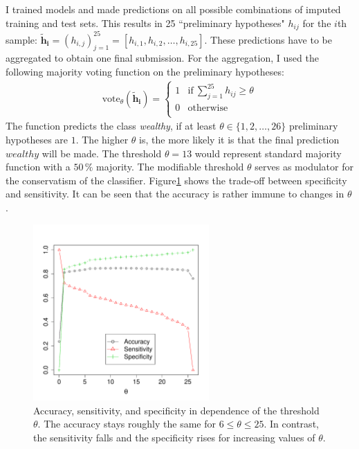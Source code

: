 \documentclass[a4paper]{article}
\begin{document}
I trained models and made predictions on all possible combinations of
imputed training and test sets. This results in 25 ``preliminary
hypotheses" $h_{ij}$ for the $i$th sample:
$\mathbf{\tilde{h}_i} = (h_{i,j})_{j = 1}^{25} = [h_{i,1}, h_{i,2}, \ldots, h_{i,25}]$. These
predictions have to be aggregated to obtain one final submission. For
the aggregation, I used the following majority voting function on the
preliminary hypotheses:
\begin{align}
\text{vote}_\theta(\mathbf{\tilde{h}_i}) =
\begin{cases}
1 & \text{if}~\sum_{j = 1}^{25} h_{ij} \geq \theta\\
0 & \text{otherwise }\\
\end{cases}
\end{align}
The function predicts the class \emph{wealthy}, if at least
$\theta \in \{1, 2, \ldots, 26\}$ preliminary hypotheses are $1$.  The
higher $\theta$ is, the more likely it is that the final prediction
$wealthy$ will be made. The threshold $\theta = 13$ would represent
standard majority function with a $50\,\%$ majority.  The modifiable
threshold $\theta$ serves as modulator for the conservatism of the
classifier. Figure\ref{fig:tuning} shows the trade-off between
specificity and sensitivity. It can be seen that the accuracy is
rather immune to changes in $\theta$.

\begin{figure}[h]
  \centering
  \includegraphics[width=0.6\textwidth]{../Python/theta}
  \caption{Accuracy, sensitivity, and specificity in dependence of the
    threshold $\theta$. The accuracy stays roughly the same for
    $6 \leq \theta \leq 25$. In contrast, the sensitivity falls and
    the specificity rises for increasing values of $\theta$.}
  \label{fig:tuning}
\end{figure}
\end{document}
